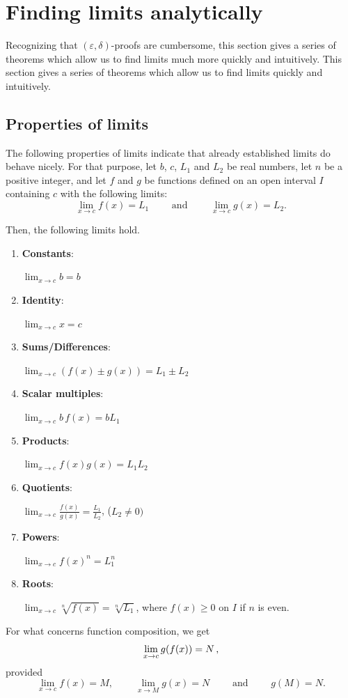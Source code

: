 \fi



\section{Finding limits analytically}
\label{sec:berekenen_lim}
\ifcourse Recognizing that $(\varepsilon,\delta)$-proofs are cumbersome, this section gives a series of theorems which allow us to find limits much more quickly and intuitively. \fi
\ifvc This section gives a series of theorems which allow us to find limits quickly and intuitively. \fi
\subsection{Properties of limits}
 The following properties of limits indicate that already established limits do behave nicely. For that purpose, let $b$, $c$, $L_1$ and $L_2$ be real numbers, let $n$ be a positive integer, and let $f$ and $g$ be functions defined on an open interval $I$ containing $c$ with the following limits: 
$$\lim_{x\to c}f(x) = L_1 \qquad \text{\ and\ }\qquad \lim_{x\to c} g(x) = L_2.$$


Then, the following limits hold.
\begin{enumerate}
\item \parbox{120pt}{\textbf{Constants}:} $\displaystyle \lim_{x\to c} b = b$
\item	\parbox{120pt}{\textbf{Identity}:}						$\displaystyle \lim_{x\to c} x = c$
\item	\parbox{120pt}{\textbf{Sums/Differences}:} $\displaystyle \lim_{x\to c}(f(x)\pm g(x)) = L_1\pm L_2$
\item	\parbox{120pt}{\textbf{Scalar multiples}:}	$\displaystyle \lim_{x\to c} b\, f(x) = bL_1$
\item	\parbox{120pt}{\textbf{Products}:}	$\displaystyle \lim_{x\to c} f(x) g(x) = L_1L_2$
\item	\parbox{120pt}{\textbf{Quotients}:} $\displaystyle \lim_{x\to c} \frac{f(x)}{g(x)} = \frac{L_1}{L_2}$, ($L_2\neq 0)$
\item	\parbox{120pt}{\textbf{Powers}:} 	$\displaystyle \lim_{x\to c} f(x)^n = L_1^n$
\item	\parbox{120pt}{\textbf{Roots}:}		$\displaystyle \lim_{x\to c} \sqrt[n]{f(x)} = \sqrt[n]{L_1}$, where $f(x)\geq 0$ on $I$ if $n$ is even.
\end{enumerate}

For what concerns function composition, we get
 $$\displaystyle \lim_{x\to c}g(f(x)) = N\,,$$
provided
$$\lim_{x\to c}f(x) = M,\qquad\ \lim_{x\to M} g(x) = N\qquad \text{\ and\ }\qquad g(M)=N .$$

